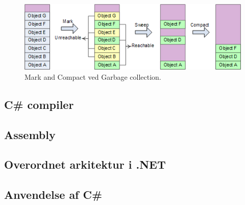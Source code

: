 \begin{figure}[h]
\centering
\includegraphics[width=0.8\linewidth]{figs/markandsweep}
\caption{Mark and Compact ved Garbage collection.}
\label{fig:markandsweep}
\end{figure}


\subsection{C\# compiler}

\subsection{Assembly}

\subsection{Overordnet arkitektur i .NET}

\subsection{Anvendelse af C\#}
